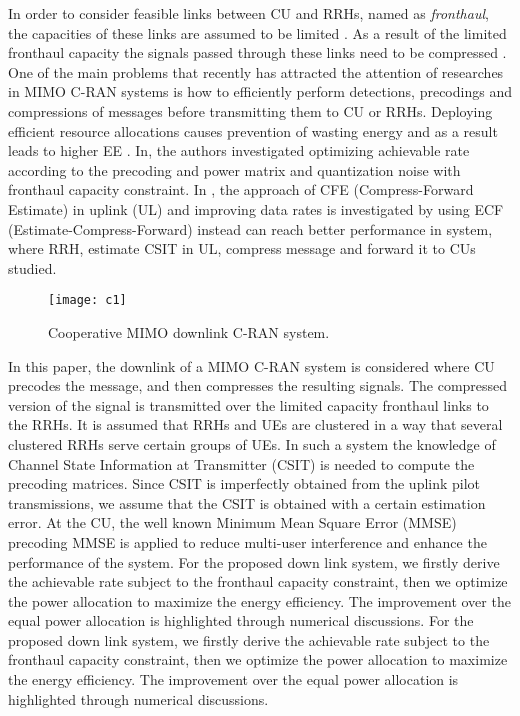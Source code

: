 \documentclass[conference,10pt,twocolumn,letter]{IEEEtran}
\begin{document}
In order to consider feasible links between CU and RRHs, named as \emph{fronthaul}, the capacities of these links are assumed to be limited \cite{22,44,1111,66}. As a result of the limited fronthaul capacity the signals passed through these links need to be compressed \cite{22,44,1111,66} . One of the main problems that recently has attracted the attention of researches in MIMO C-RAN systems is how to efficiently perform detections, precodings and compressions of messages before transmitting them to CU or RRHs. Deploying efficient resource allocations causes prevention of wasting energy and as a result leads to higher EE \cite{33,55,77}. In\cite{22,44,1111,66}, the authors investigated optimizing achievable rate according to the precoding and power matrix and quantization noise with fronthaul capacity constraint. In \cite{66}, the approach of CFE (Compress-Forward Estimate) in uplink (UL) and improving data rates is investigated by using ECF (Estimate-Compress-Forward) instead can reach better performance in system, where RRH, estimate CSIT in UL, compress message and forward it to CUs studied.
\begin{figure}[t]
  \centering
    \texttt{[image: c1]}
  \caption{Cooperative MIMO downlink C-RAN system.}
  \label{fig:c11}
\end{figure}

In this paper, the downlink of a MIMO C-RAN system is considered where CU precodes the message, and then compresses the resulting signals. The compressed version of the signal is transmitted over the limited capacity fronthaul links to the RRHs. It is assumed that RRHs and UEs are clustered in a way that several clustered RRHs serve certain groups of UEs. In such a system the knowledge of Channel State Information at Transmitter (CSIT) is needed to compute the precoding matrices. Since CSIT is imperfectly obtained from the uplink pilot transmissions, we assume that the CSIT is obtained with a certain estimation error. At the CU, the well known Minimum Mean Square Error (MMSE) precoding MMSE is applied to reduce multi-user interference and enhance the performance of the system. For the proposed down link system, we firstly derive the achievable rate subject to the fronthaul capacity constraint, then we optimize the power allocation to maximize the energy efficiency. The improvement over the equal power allocation is highlighted through numerical discussions. For the proposed down link system, we firstly derive the achievable rate subject to the fronthaul capacity constraint, then we optimize the power allocation to maximize the energy efficiency. The improvement over the equal power allocation is highlighted through numerical discussions.
\end{document}
